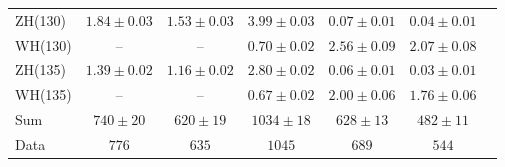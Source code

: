 \documentclass[12pt,twoside,a4paper,cmspaper,final,collab]{cms-tdr}
\begin{document}
\begin{table}[tbp]
\begin{center}
{\begin{tabular}{lcccccc}
ZH(130) &  $1.84 \pm 0.03$ & $1.53 \pm 0.03$ & $3.99\pm 0.03$ &  $0.07 \pm 0.01$ &  $0.04 \pm 0.01$ \\
WH(130) &  -- & -- & $0.70\pm 0.02$ & $2.56 \pm 0.09$ & $2.07 \pm 0.08$ \\
ZH(135) &  $1.39 \pm 0.02$ &  $1.16 \pm 0.02$ & $2.80\pm 0.02$ &  $0.06 \pm 0.01$ &  $0.03 \pm 0.01$ \\
WH(135) &  -- & -- & $0.67\pm 0.02$ & $2.00 \pm 0.06$ & $1.76 \pm 0.06$ \\
\hline
Sum &$740 \pm 20$&$620 \pm 19$ & $1034 \pm 18$ & $628\pm 13$ &$482\pm 11$\\\hline
Data &    $776$ &$635$ & $1045$ &  $689$ & $544$\\
\hline
\end{tabular}
}
\end{center}
\end{table}
\end{document}
